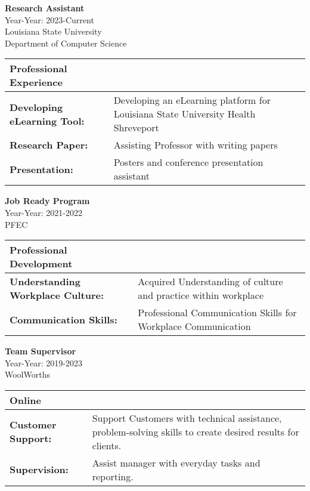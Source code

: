 \documentclass[a4paper,9pt]{article}
\begin{document}
\noindent
\textbf{Research Assistant} \\
Year-Year: 2023-Current \\
Louisiana State University \\
Department of Computer Science \\
\begin{tabular}{|p{}|p{}|}
\hline
\textbf{Professional Experience} & \\
\hline
\textbf{Developing eLearning Tool:} & Developing an eLearning platform for Louisiana State University Health Shreveport \\
\hline
\textbf{Research Paper:} & Assisting Professor with writing papers \\
\hline
\textbf{Presentation:} & Posters and conference presentation assistant \\
\hline
\end{tabular}
\vspace{\baselineskip}
\noindent
\textbf{Job Ready Program} \\
Year-Year: 2021-2022 \\
PFEC \\
\begin{tabular}{|p{}|p{}|}
\hline
\textbf{Professional Development} & \\
\hline
\textbf{Understanding Workplace Culture:} & Acquired Understanding of culture and practice within workplace \\
\hline
\textbf{Communication Skills:} & Professional Communication Skills for Workplace Communication \\
\hline
\end{tabular}
\vspace{\baselineskip}
\noindent
\textbf{Team Supervisor} \\
Year-Year: 2019-2023 \\
WoolWorths \\
\begin{tabular}{|p{}|p{}|}
\hline
\textbf{Online} & \\
\hline
\textbf{Customer Support:} & Support Customers with technical assistance, problem-solving skills to create desired results for clients. \\
\hline
\textbf{Supervision:} & Assist manager with everyday tasks and reporting. \\
\hline
\end{tabular}

\end{document}
